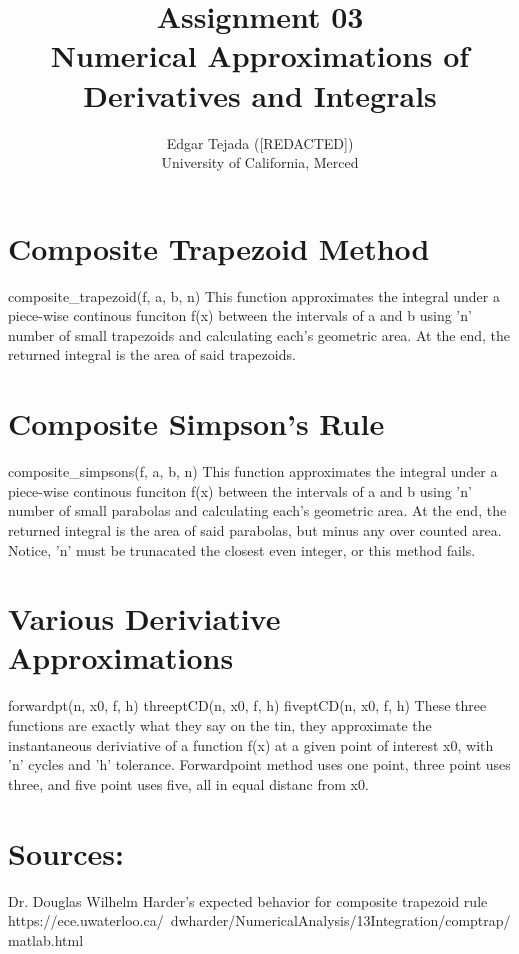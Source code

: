 \documentclass [12pt]{article}
\title{Assignment 03 \\\medskip Numerical Approximations of Derivatives and Integrals}
\author{Edgar Tejada ([REDACTED])\\University of California, Merced}
\begin{document}
\maketitle

\newpage
\section{Composite Trapezoid Method}
\indent composite_trapezoid(f, a, b, n)
\indent \indent This function approximates the integral under a piece-wise continous funciton f(x) between the intervals of a and b using 'n' number of small trapezoids and calculating each's geometric area. At the end, the returned integral is the area of said trapezoids. 

\newpage
\section{Composite Simpson's Rule}
\indent composite_simpsons(f, a, b, n)
\indent \indent This function approximates the integral under a piece-wise continous funciton f(x) between the intervals of a and b using 'n' number of small parabolas and calculating each's geometric area. At the end, the returned integral is the area of said parabolas, but minus any over counted area. Notice, 'n' must be trunacated the closest even integer, or this method fails. 

\newpage
\section{Various Deriviative Approximations}
\indent forwardpt(n, x0, f, h)
\indent threeptCD(n, x0, f, h)
\indent fiveptCD(n, x0, f, h)
\indent \indent These three functions are exactly what they say on the tin, they approximate the instantaneous deriviative of a function f(x) at a given point of interest x0, with 'n' cycles and 'h' tolerance. Forwardpoint method uses one point, three point uses three, and five point uses five, all in equal distanc from x0.


\newpage
\section{Sources:}
Dr. Douglas Wilhelm Harder's expected behavior for composite trapezoid rule
\indent https://ece.uwaterloo.ca/~dwharder/NumericalAnalysis/13Integration/comptrap/matlab.html


\nocite{*} 
\printbibliography
\end{document}

